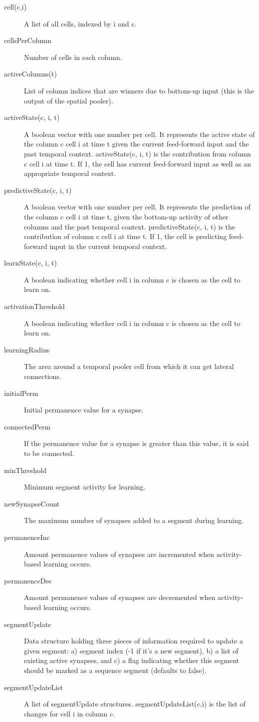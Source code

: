 \documentclass{report}
\begin{document}
\begin{description}
\item[cell(c,i)] A list of all cells, indexed by i and c.
\item[cellsPerColumn] Number of cells in each column.
\item[activeColumns(t)] List of column indices that are winners due to
  bottom-up input (this is the output of the spatial pooler).
\item[activeState(c, i, t)] A boolean vector with one number per
  cell. It represents the active state of the column c cell i at time
  t given the current feed-forward input and the past temporal
  context. activeState(c, i, t) is the contribution from column c cell
  i at time t. If 1, the cell has current feed-forward input as well
  as an appropriate temporal context.
\item[predictiveState(c, i, t)] A boolean vector with one number per
  cell. It represents the prediction of the column c cell i at time t,
  given the bottom-up activity of other columns and the past temporal
  context. predictiveState(c, i, t) is the contribution of column c
  cell i at time t. If 1, the cell is predicting feed-forward input in
  the current temporal context.
\item[learnState(c, i, t)] A boolean indicating whether cell i in
  column c is chosen as the cell to learn on.
\item[activationThreshold] A boolean indicating whether cell i in
  column c is chosen as the cell to learn on.
\item[learningRadius] The area around a temporal pooler cell from
  which it can get lateral connections.
\item[initialPerm] Initial permanence value for a synapse.
\item[connectedPerm] If the permanence value for a synapse is greater
  than this value, it is said to be connected.
\item[minThreshold] Minimum segment activity for learning.
\item[newSynapseCount] The maximum number of synapses added to a
  segment during learning.
\item[permanenceInc] Amount permanence values of synapses are
  incremented when activity-based learning occurs.
\item[permanenceDec] Amount permanence values of synapses are
  decremented when activity-based learning occurs.
\item[segmentUpdate] Data structure holding three pieces of
  information required to update a given segment: a) segment index (-1
  if it's a new segment), b) a list of existing active synapses, and
  c) a flag indicating whether this segment should be marked as a
  sequence segment (defaults to false).
\item[segmentUpdateList] A list of segmentUpdate
  structures. segmentUpdateList(c,i) is the list of changes for cell i
  in column c.
\end{description}
\end{document}
